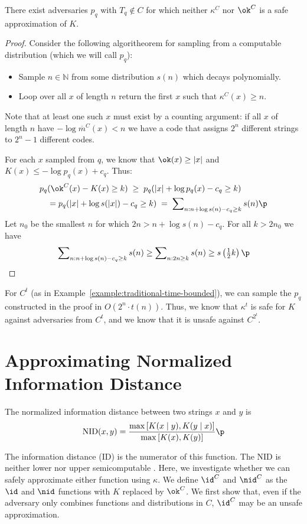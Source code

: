 \begin{theorem} 
There exist adversaries $p_q$ with $T_q \notin C$ for which neither $\kappa^C$ nor $\ok^C$ is a safe approximation of $K$. 
\label{theorem:unsafe-outside}
\end{theorem}
\begin{proof}
Consider the following algoritheorem for sampling from a computable distribution (which we will call $p_q$):
\begin{itemize}
\item Sample $n \in {\mathbb N}$ from some distribution $s(n)$ which decays polynomially. 
\item Loop over all $x$ of length $n$ return the first $x$ such that $\kappa^C(x) \geq n$. 
\end{itemize}
Note that at least one such $x$ must exist by a counting argument: if all $x$ of length $n$ have  $-\log \overline{m}^C(x) < n$ we have a code that assigns $2^n$ different strings to $2^n-1$ different codes.

For each $x$ sampled from $q$, we know that $\ok(x) \geq |x|$ and $K(x) \leq -\log p_q(x) + c_q$. Thus: 
\begin{align*}
p_q&(\ok^C(x) - K(x) \geq k) \;\geq\; p_q(|x| + \log p_q(x) - c_q \geq k) \\
&= p_q(|x| + \log s(|x|) - c_q \geq k) \;=\; \sum\nolimits_{n:n + \log s(n) - c_q \geq k} s(n)\p
\end{align*}
Let $n_0$ be the smallest $n$ for which $2n > n + \log s(n) - c_q$. For all $k > 2n_0$ we have \belowdisplayskip=-12pt
\begin{align*}
\sum\nolimits_{n:n + \log s(n) - c_q \geq k} s(n) \geq \sum\nolimits_{n: 2n \geq k} s(n) \geq s\left(\tfrac{1}{2} k\right)\p
\end{align*}
\end{proof}
For $C^t$ (as in Example~\ref{example:traditional-time-bounded}), we can sample the $p_q$ constructed in the proof in $O(2^n\cdot t(n))$. Thus, we know that $\kappa^t$ is safe for $K$ against adversaries from $C^t$, and we know that it is unsafe against $C^{2^t}$.
\section{Approximating Normalized Information Distance}

\begin{definition}
The normalized information distance between two strings $x$ and $y$ is 
\[
\text{NID}(x, y) = \frac{\max \left [ K(x\mid y), K(y\mid x)\right ]}{\max \left [K(x), K(y)\right ]} \p
\]
\label{definition:nid}
\end{definition}
The information distance (ID) is the numerator of this function. The NID is neither lower nor upper semicomputable \cite{DBLP:journals/jcss/TerwijnTV11}. Here, we investigate whether we can safely approximate either function using $\kappa$. We define $\id^C$ and $\nid^C$ as the $\id$ and $\nid$ functions with $K$ replaced by $\ok^C$. We first show that, even if the adversary only combines functions and distributions in $C$, $\id^C$ may be an unsafe approximation.

